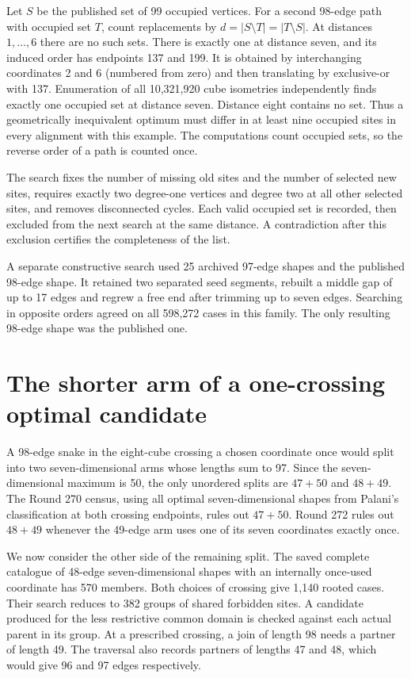 \documentclass[11pt,a4paper]{article}
\theoremstyle{definition}
\theoremstyle{remark}
\begin{document}
Let \(S\) be the published set of 99 occupied vertices. For a second 98-edge path with occupied set \(T\), count replacements by \(d=|S\setminus T|=|T\setminus S|\). At distances \(1,\ldots,6\) there are no such sets. There is exactly one at distance seven, and its induced order has endpoints 137 and 199. It is obtained by interchanging coordinates 2 and 6 (numbered from zero) and then translating by exclusive-or with 137. Enumeration of all 10,321,920 cube isometries independently finds exactly one occupied set at distance seven. Distance eight contains no set. Thus a geometrically inequivalent optimum must differ in at least nine occupied sites in every alignment with this example. The computations count occupied sets, so the reverse order of a path is counted once.

The search fixes the number of missing old sites and the number of selected new sites, requires exactly two degree-one vertices and degree two at all other selected sites, and removes disconnected cycles. Each valid occupied set is recorded, then excluded from the next search at the same distance. A contradiction after this exclusion certifies the completeness of the list.

A separate constructive search used 25 archived 97-edge shapes and the published 98-edge shape. It retained two separated seed segments, rebuilt a middle gap of up to 17 edges and regrew a free end after trimming up to seven edges. Searching in opposite orders agreed on all 598,272 cases in this family. The only resulting 98-edge shape was the published one.

\section{The shorter arm of a one-crossing optimal candidate}
A 98-edge snake in the eight-cube crossing a chosen coordinate once would split into two seven-dimensional arms whose lengths sum to 97. Since the seven-dimensional maximum is 50, the only unordered splits are \(47+50\) and \(48+49\). The Round 270 census, using all optimal seven-dimensional shapes from Palani's classification at both crossing endpoints, rules out \(47+50\). Round 272 rules out \(48+49\) whenever the 49-edge arm uses one of its seven coordinates exactly once.

We now consider the other side of the remaining split. The saved complete catalogue of 48-edge seven-dimensional shapes with an internally once-used coordinate has 570 members. Both choices of crossing give 1,140 rooted cases. Their search reduces to 382 groups of shared forbidden sites. A candidate produced for the less restrictive common domain is checked against each actual parent in its group. At a prescribed crossing, a join of length 98 needs a partner of length 49. The traversal also records partners of lengths 47 and 48, which would give 96 and 97 edges respectively.
\end{document}
